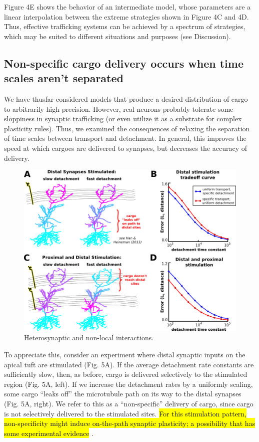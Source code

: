 \documentclass[10pt]{wlpeerj}
\begin{document}
Figure 4E shows the behavior of an intermediate model, whose parameters are a linear interpolation between the extreme strategies shown in Figure 4C and 4D.
Thus, effective trafficking systems can be achieved by a spectrum of strategies, which may be suited to different situations and purposes (see Discussion). 

\subsection*{Non-specific cargo delivery occurs when time scales aren't separated}

We have thusfar considered models that produce a desired distribution of cargo to arbitrarily high precision.
However, real neurons probably tolerate some sloppiness in synaptic trafficking (or even utilize it as a substrate for complex plasticity rules).
Thus, we examined the consequences of relaxing the separation of time scales between transport and detachment.
In general, this improves the speed at which cargoes are delivered to synapses, but decreases the accuracy of delivery.

\begin{figure}[!htbp]
\begin{center}
\includegraphics[width=0.9\columnwidth]{05_heterosynaptic_ca1.png}
\caption{Heterosynaptic and non-local interactions.
}
\end{center}
\end{figure}

To appreciate this, consider an experiment where distal synaptic inputs on the apical tuft are stimulated (Fig. 5A).
If the average detachment rate constants are sufficiently slow, then, as before, cargo is delivered selectively to the stimulated region (Fig. 5A, left).
If we increase the detachment rates by a uniformly scaling, some cargo ``leaks off'' the microtubule path on its way to the distal synapses (Fig. 5A, right).
We refer to this as a ``non-specific'' delivery of cargo, since cargo is not selectively delivered to the stimulated sites.
\hl{For this stimulation pattern, non-specificity might induce on-the-path synaptic plasticity; a possibility that has some experimental evidence} \citep{Han_2013}.
\end{document}
